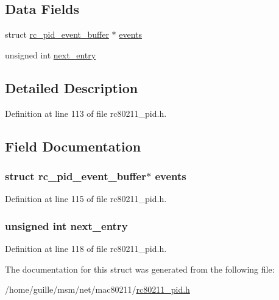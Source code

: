 \subsection*{Data Fields}
\begin{DoxyCompactItemize}
\item 
struct \hyperlink{structrc__pid__event__buffer}{rc\-\_\-pid\-\_\-event\-\_\-buffer} $\ast$ \hyperlink{structrc__pid__events__file__info_a64b7495c9f679034d3c77eb22e63d369}{events}
\item 
unsigned int \hyperlink{structrc__pid__events__file__info_a504ce2058dfc4cdd4cf89d9e63c34b89}{next\-\_\-entry}
\end{DoxyCompactItemize}


\subsection{Detailed Description}


Definition at line 113 of file rc80211\-\_\-pid.\-h.



\subsection{Field Documentation}
\hypertarget{structrc__pid__events__file__info_a64b7495c9f679034d3c77eb22e63d369}{
\subsubsection[{events}]{\setlength{\rightskip}{0pt plus 5cm}struct {\bf rc\-\_\-pid\-\_\-event\-\_\-buffer}$\ast$ events}}\label{structrc__pid__events__file__info_a64b7495c9f679034d3c77eb22e63d369}


Definition at line 115 of file rc80211\-\_\-pid.\-h.

\hypertarget{structrc__pid__events__file__info_a504ce2058dfc4cdd4cf89d9e63c34b89}{
\subsubsection[{next\-\_\-entry}]{\setlength{\rightskip}{0pt plus 5cm}unsigned int next\-\_\-entry}}\label{structrc__pid__events__file__info_a504ce2058dfc4cdd4cf89d9e63c34b89}


Definition at line 118 of file rc80211\-\_\-pid.\-h.



The documentation for this struct was generated from the following file\-:\begin{DoxyCompactItemize}
\item 
/home/guille/msm/net/mac80211/\hyperlink{rc80211__pid_8h}{rc80211\-\_\-pid.\-h}\end{DoxyCompactItemize}
